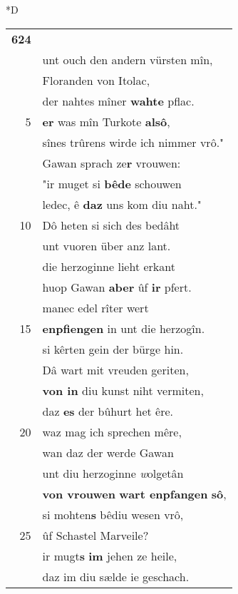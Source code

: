 \documentclass[8pt,a4paper,notitlepage]{article}
\begin{document}
\begin{table}[ht]
\begin{minipage}[t]{0.5\linewidth}
\small
\begin{center}*D
\end{center}
\begin{tabular}{rl}
\textbf{624} & \textbf{\textit{\begin{large}D\end{large}}en herzogen} von Gowerzin,\\ 
 & unt ouch den andern vürsten mîn,\\ 
 & Floranden von Itolac,\\ 
 & der nahtes mîner \textbf{wahte} pflac.\\ 
5 & \textbf{er} was mîn Turkote \textbf{alsô},\\ 
 & sînes trûrens wirde ich nimmer vrô."\\ 
 & Gawan sprach ze\textbf{r} vrouwen:\\ 
 & "ir muget si \textbf{bêde} schouwen\\ 
 & ledec, ê \textbf{daz} uns kom diu naht."\\ 
10 & Dô heten si sich des bedâht\\ 
 & unt vuoren über anz lant.\\ 
 & die herzoginne lieht erkant\\ 
 & huop Gawan \textbf{aber} ûf \textbf{ir} pfert.\\ 
 & manec edel rîter wert\\ 
15 & \textbf{enpfiengen} in unt die herzogîn.\\ 
 & si kêrten gein der bürge hin.\\ 
 & Dâ wart mit vreuden geriten,\\ 
 & \textbf{von in} diu kunst niht vermiten,\\ 
 & daz \textbf{es} der bûhurt het êre.\\ 
20 & waz mag ich sprechen mêre,\\ 
 & wan daz der werde Gawan\\ 
 & unt diu herzoginne \textit{w}olgetân\\ 
 & \textbf{von vrouwen} \textbf{wart enpfangen} \textbf{sô},\\ 
 & si mohten\textbf{s} bêdiu wesen vrô,\\ 
25 & ûf Schastel Marveile?\\ 
 & ir mugt\textbf{s} \textbf{im} jehen ze heile,\\ 
 & daz im diu sælde ie geschach.\\ 

\end{tabular}
\end{minipage}
\end{table}
\end{document}
